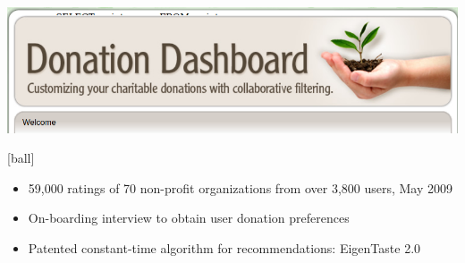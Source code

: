         
        \vspace{3ex}
        \includegraphics[scale=0.2]{GraphicFiles/DonationDashboard.png}
        
        [ball]
        \begin{itemize}
            \item 59,000 ratings of 70 non-profit organizations from over 3,800 users, May 2009
            \item On-boarding interview to obtain user donation preferences
            \item Patented constant-time algorithm for recommendations: EigenTaste 2.0
        \end{itemize}
        \vspace{3ex}